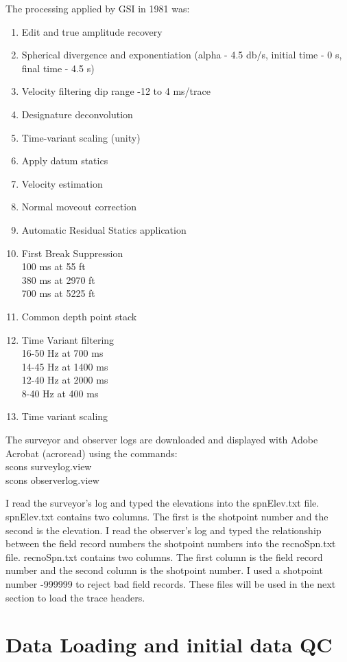 The processing applied by GSI in 1981 was:
\begin{enumerate}
\item Edit and true amplitude recovery
\item Spherical divergence and exponentiation
(alpha - 4.5 db/s, initial time - 0 s, final time - 4.5 s)
\item Velocity filtering dip range -12 to 4 ms/trace
\item Designature deconvolution
\item Time-variant scaling (unity)
\item Apply datum statics
\item Velocity estimation
\item Normal moveout correction
\item Automatic Residual Statics application
\item First Break Suppression \\
100 ms at 55 ft\\
380 ms at 2970 ft\\
700 ms at 5225 ft
\item Common depth point stack
\item Time Variant filtering \\
16-50 Hz at 700 ms\\
14-45 Hz at 1400 ms\\
12-40 Hz at 2000 ms\\
8-40 Hz at 400 ms
\item Time variant scaling
\end{enumerate}

The surveyor and observer logs are downloaded and displayed with Adobe 
Acrobat (acroread) using the commands:
\\
scons surveylog.view \\
scons observerlog.view

I read the surveyor's log and typed the elevations into the spnElev.txt 
file.  spnElev.txt contains two columns.  The first is the shotpoint 
number and the second is the elevation.  I read the observer's log and 
typed the relationship between the field record numbers the shotpoint 
numbers into the recnoSpn.txt file.  recnoSpn.txt contains two columns.  
The first column is the field record number and the second column is the 
shotpoint number. I used a shotpoint number -999999 to reject bad field 
records.  These files will be used in the next section to load the trace 
headers.

\section{Data Loading and initial data QC}

